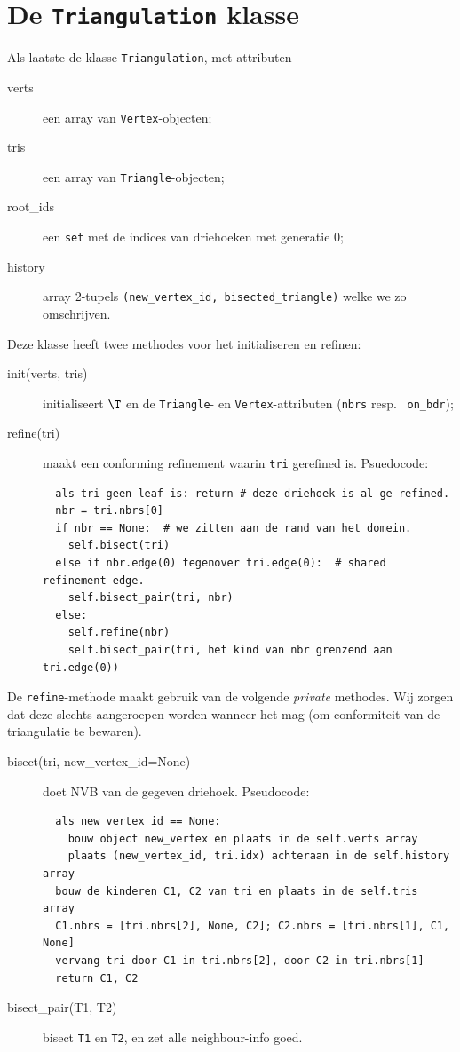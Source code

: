 \documentclass[11pt,a4paper]{amsart}
\theoremstyle{definition}
\begin{document}
\section*{De \texttt{Triangulation} klasse}
Als laatste de klasse \texttt{Triangulation}, met attributen
\begin{description}
  \item[verts] een array van \texttt{Vertex}-objecten;
  \item[tris] een array van \texttt{Triangle}-objecten;
  \item[root\_ids] een \texttt{set} met de indices van driehoeken met generatie 0;
  \item[history] array 2-tupels \texttt{(new\_vertex\_id, bisected\_triangle)} welke we zo omschrijven.
\end{description}
Deze klasse heeft twee methodes voor het initialiseren en refinen:
\begin{description}
  \item[init(verts, tris)] initialiseert $\T$ en de \texttt{Triangle}- en
    \texttt{Vertex}-attributen (\texttt{nbrs} resp.~ \texttt{on\_bdr});
  \item[refine(tri)] maakt een conforming refinement waarin \texttt{tri} gerefined is. Psuedocode:
\begin{verbatim}
  als tri geen leaf is: return # deze driehoek is al ge-refined.
  nbr = tri.nbrs[0]
  if nbr == None:  # we zitten aan de rand van het domein.
    self.bisect(tri)
  else if nbr.edge(0) tegenover tri.edge(0):  # shared refinement edge.
    self.bisect_pair(tri, nbr)
  else:
    self.refine(nbr)
    self.bisect_pair(tri, het kind van nbr grenzend aan tri.edge(0))
\end{verbatim}
\end{description}
De \texttt{refine}-methode maakt gebruik van de volgende \emph{private} methodes.
Wij zorgen dat deze slechts aangeroepen worden wanneer het mag (om conformiteit van de triangulatie te bewaren).
\begin{description}
  \item[bisect(tri, new\_vertex\_id=None)] doet NVB van de gegeven driehoek. Pseudocode:
\begin{verbatim}
  als new_vertex_id == None:
    bouw object new_vertex en plaats in de self.verts array
    plaats (new_vertex_id, tri.idx) achteraan in de self.history array
  bouw de kinderen C1, C2 van tri en plaats in de self.tris array
  C1.nbrs = [tri.nbrs[2], None, C2]; C2.nbrs = [tri.nbrs[1], C1, None]
  vervang tri door C1 in tri.nbrs[2], door C2 in tri.nbrs[1]
  return C1, C2
\end{verbatim}
  \item[bisect\_pair(T1, T2)] bisect \texttt{T1} en \texttt{T2}, en zet alle neighbour-info goed.
\end{description}
\end{document}
